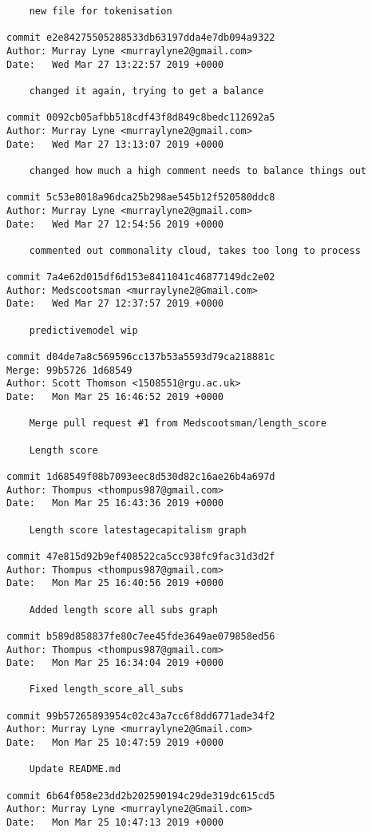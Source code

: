 \begin{lstlisting}
    new file for tokenisation

commit e2e84275505288533db63197dda4e7db094a9322
Author: Murray Lyne <murraylyne2@gmail.com>
Date:   Wed Mar 27 13:22:57 2019 +0000

    changed it again, trying to get a balance

commit 0092cb05afbb518cdf43f8d849c8bedc112692a5
Author: Murray Lyne <murraylyne2@gmail.com>
Date:   Wed Mar 27 13:13:07 2019 +0000

    changed how much a high comment needs to balance things out

commit 5c53e8018a96dca25b298ae545b12f520580ddc8
Author: Murray Lyne <murraylyne2@gmail.com>
Date:   Wed Mar 27 12:54:56 2019 +0000

    commented out commonality cloud, takes too long to process

commit 7a4e62d015df6d153e8411041c46877149dc2e02
Author: Medscootsman <murraylyne2@Gmail.com>
Date:   Wed Mar 27 12:37:57 2019 +0000

    predictivemodel wip

commit d04de7a8c569596cc137b53a5593d79ca218881c
Merge: 99b5726 1d68549
Author: Scott Thomson <1508551@rgu.ac.uk>
Date:   Mon Mar 25 16:46:52 2019 +0000

    Merge pull request #1 from Medscootsman/length_score
    
    Length score

commit 1d68549f08b7093eec8d530d82c16ae26b4a697d
Author: Thompus <thompus987@gmail.com>
Date:   Mon Mar 25 16:43:36 2019 +0000

    Length score latestagecapitalism graph

commit 47e815d92b9ef408522ca5cc938fc9fac31d3d2f
Author: Thompus <thompus987@gmail.com>
Date:   Mon Mar 25 16:40:56 2019 +0000

    Added length score all subs graph

commit b589d858837fe80c7ee45fde3649ae079858ed56
Author: Thompus <thompus987@gmail.com>
Date:   Mon Mar 25 16:34:04 2019 +0000

    Fixed length_score_all_subs

commit 99b57265893954c02c43a7cc6f8dd6771ade34f2
Author: Murray Lyne <murraylyne2@Gmail.com>
Date:   Mon Mar 25 10:47:59 2019 +0000

    Update README.md

commit 6b64f058e23dd2b202590194c29de319dc615cd5
Author: Murray Lyne <murraylyne2@Gmail.com>
Date:   Mon Mar 25 10:47:13 2019 +0000


\end{lstlisting}
